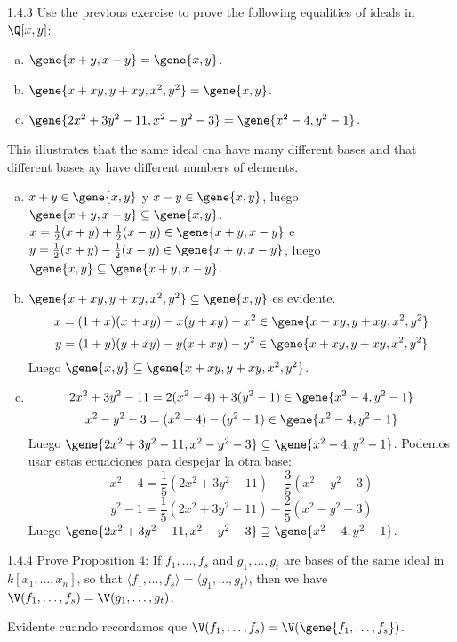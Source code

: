 \documentclass[twoside]{article}
\begin{document}
\newpage

\begin{ejercicio}{1.4.3}
Use the previous exercise to prove the following equalities of ideals in $\Q[x,y]$:
\begin{enumerate}[a.]
\item $\gene{x+y,x-y} = \gene{x,y}$.
\item $\gene{x+xy, y+xy, x^2, y^2} = \gene{x, y}$.
\item $\gene{2x^2+3y^2-11, x^2-y^2-3} = \gene{x^2-4, y^2-1}$.
\end{enumerate}
This illustrates that the same ideal cna have many different bases and that different bases ay have different numbers of elements.
\end{ejercicio}
\begin{solucion}\mbox{}
\begin{enumerate}[a.]
\item $x+y \in \gene{x,y}$ y $x-y \in \gene{x,y}$, luego $\gene{x+y,x-y} \subseteq \gene{x,y}$.
$x = \frac{1}{2} (x+y) + \frac{1}{2}  (x-y) \in \gene{x+y,x-y}$ e $y = \frac{1}{2} (x+y) - \frac{1}{2} (x-y) \in \gene{x+y, x-y}$, luego $\gene{x,y} \subseteq \gene{x+y,x-y}$.
\item $\gene{x+xy, y+xy, x^2, y^2} \subseteq \gene{x, y}$ es evidente.
\[ x = (1+x)(x + xy) - x(y+xy) - x^2 \in \gene{x+xy, y+xy, x^2, y^2} \]
\[ y = (1+y)(y + xy) - y(x+xy) - y^2 \in \gene{x+xy, y+xy, x^2, y^2} \]
Luego $\gene{x,y} \subseteq \gene{x+xy, y+xy, x^2, y^2}$.
\item 
\[ 2x^2+3y^2 - 11 = 2(x^2-4)+3(y^2-1) \in \gene{x^2-4, y^2-1} \]
\[ x^2-y^2-3 = (x^2-4) - (y^2-1) \in \gene{x^2-4, y^2-1} \]
Luego $\gene{2x^2+3y^2-11, x^2-y^2-3} \subseteq \gene{x^2-4, y^2-1}$.
Podemos usar estas ecuaciones para despejar la otra base:
\[ x^2-4 = \frac{1}{5} (2x^2+3y^2-11) - \frac{3}{5} (x^2-y^2-3) \]
\[ y^2-1 = \frac{1}{5}(2x^2+3y^2-11) - \frac{2}{5}(x^2-y^2-3) \]
Luego $\gene{2x^2+3y^2-11, x^2-y^2-3} \supseteq \gene{x^2-4, y^2-1}$.
\end{enumerate}
\end{solucion}

\newpage

\begin{ejercicio}{1.4.4}
Prove Proposition 4: If $f_1,\dots,f_s$ and $g_1,\dots,g_t$ are bases of the same ideal in $k[x_1,\dots,x_n]$, so that $\langle f_1,\dots,f_s\rangle = \langle g_1,\dots,g_t\rangle$, then we have $\V(f_1,\dots,f_s) = \V(g_1,\dots,g_t)$.
\end{ejercicio}
\begin{solucion}
Evidente cuando recordamos que $\V(f_1,\dots,f_s) = \V(\gene{f_1,\dots,f_s})$.
\end{solucion}
\end{document}
